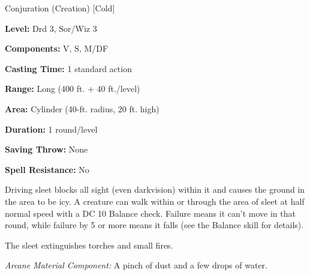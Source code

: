 
Conjuration (Creation) [Cold]

\textbf{Level:} Drd 3, Sor/Wiz 3

\textbf{Components:} V, S, M/DF

\textbf{Casting Time:} 1 standard action

\textbf{Range:} Long (400 ft. + 40 ft./level)

\textbf{Area:} Cylinder (40-ft. radius, 20 ft. high)

\textbf{Duration:} 1 round/level

\textbf{Saving Throw:} None

\textbf{Spell Resistance:} No

Driving sleet blocks all sight (even darkvision) within it and causes the ground 
in the area to be icy. A creature can walk within or through the area of sleet 
at half normal speed with a DC 10 Balance check. Failure means it can't move in 
that round, while failure by 5 or more means it falls (see the Balance skill for 
details).

The sleet extinguishes torches and small fires.

\textit{Arcane Material Component:} A pinch of dust and a few drops of water.


